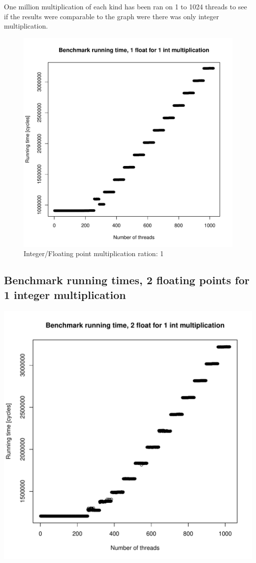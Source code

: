 \documentclass{article}
\begin{document}
	One million multiplication of each kind has been ran on 1 to 1024 threads to see if the results were comparable to the graph were there was only integer multiplication.
	\begin{figure}[h]
		\centering
		\vspace{-20pt}
    			\includegraphics[width=.5\linewidth]{"graphics/running_times_ratio11"}
		\vspace{-20pt}
		\caption{Integer/Floating point multiplication ration: 1}
	\end{figure}
	\pagebreak

	\subsection{Benchmark running times, 2 floating points for 1 integer multiplication}
	\includegraphics[width=\linewidth]{"graphics/running_times_ratio21"}
	\pagebreak
\end{document}
